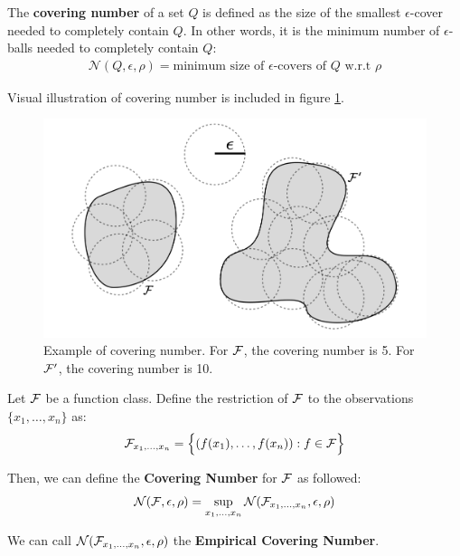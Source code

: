 \begin{definition}
    The \textbf{covering number} of a set $Q$ is defined as the size of the smallest $\epsilon$-cover needed to completely contain $Q$. In other words, it is the minimum number of $\epsilon$-balls needed to completely contain $Q$:
    \begin{align*}
        \mathcal{N}(Q, \epsilon, \rho) = \text{minimum size of $\epsilon$-covers of $Q$ w.r.t $\rho$}
    \end{align*}

    \noindent Visual illustration of covering number is included in figure \ref{fig:covering_number}.
\end{definition}

\begin{figure}[ht]
    \centering
    \includegraphics[width=\textwidth]{figures/covering_number.png}
    \caption{Example of covering number. For $\mathcal{F}$, the covering number is 5. For $\mathcal{F}'$, the covering number is 10.}
    \label{fig:covering_number}
\end{figure}


\begin{definition}
    Let $\mathcal{F}$ be a function class. Define the restriction of $\mathcal{F}$ to the observations $\{x_1, \dots, x_n\}$ as:
    \begin{align*}
        \mathcal{F}_{x_1, \dots, x_n} = \Big\{ 
            (f(x_1), \dots, f(x_n)) : f \in \mathcal{F}
         \Big\}
    \end{align*}

    \noindent Then, we can define the \textbf{Covering Number} for $\mathcal{F}$ as followed:
    \begin{align*}
        \mathcal{N}(\mathcal{F}, \epsilon, \rho) = \sup_{x_1, \dots, x_n} \mathcal{N}(\mathcal{F}_{x_1, \dots, x_n}, \epsilon, \rho)
    \end{align*}

    \noindent We can call $\mathcal{N}(\mathcal{F}_{x_1, \dots, x_n}, \epsilon, \rho)$ the \textbf{Empirical Covering Number}.
\end{definition}

